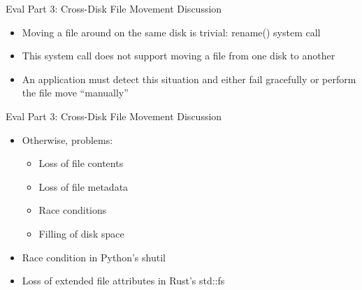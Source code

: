 \documentclass[pdf]{beamer}
\begin{document}
\begin{frame}{Eval Part 3: Cross-Disk File Movement Discussion}

  \begin{itemize}
    \item{Moving a file around on the same disk is trivial: rename() system
      call}
    \item{This system call does not support moving a file from one disk to
      another}
    \item{An application must detect this situation and either fail
      gracefully or perform the file move ``manually''}
  \end{itemize}
\end{frame}


\begin{frame}{Eval Part 3: Cross-Disk File Movement Discussion}
    \begin{itemize}
    \item{Otherwise, problems:}
      \begin{itemize}
        \item{Loss of file contents}
        \item{Loss of file metadata}
        \item{Race conditions}
        \item{Filling of disk space}
      \end{itemize}
    \item{Race condition in Python's shutil}
    \item{Loss of extended file attributes in Rust's std::fs}
  \end{itemize}
\end{frame}
\end{document}
